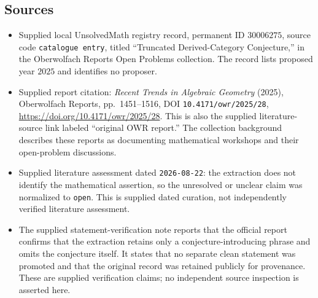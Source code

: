 \documentclass[11pt]{article}
\begin{document}
\subsection{Sources}
\begin{itemize}
\item Supplied local UnsolvedMath registry record, permanent ID \(30006275\), source code \texttt{catalogue entry}, titled ``Truncated Derived-Category Conjecture,'' in the Oberwolfach Reports Open Problems collection. The record lists proposed year \(2025\) and identifies no proposer.
\item Supplied report citation: \emph{Recent Trends in Algebraic Geometry} (2025), Oberwolfach Reports, pp.~1451--1516, DOI \texttt{10.4171/owr/2025/28}, \url{https://doi.org/10.4171/owr/2025/28}. This is also the supplied literature-source link labeled ``original OWR report.'' The collection background describes these reports as documenting mathematical workshops and their open-problem discussions.
\item Supplied literature assessment dated \texttt{2026-08-22}: the extraction does not identify the mathematical assertion, so the unresolved or unclear claim was normalized to \texttt{open}. This is supplied dated curation, not independently verified literature assessment.
\item The supplied statement-verification note reports that the official report confirms that the extraction retains only a conjecture-introducing phrase and omits the conjecture itself. It states that no separate clean statement was promoted and that the original record was retained publicly for provenance. These are supplied verification claims; no independent source inspection is asserted here.
\end{itemize}
\end{document}
